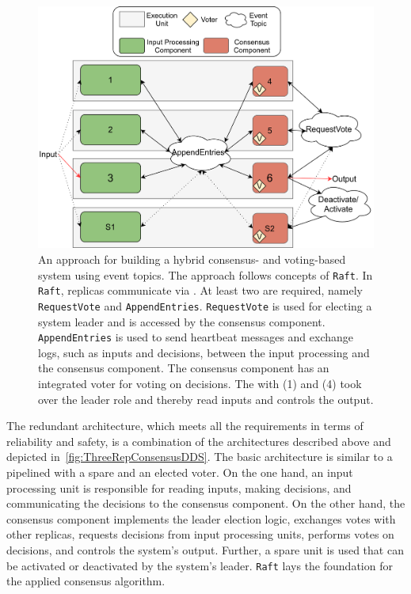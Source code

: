 \begin{figure}[!hb]
	\centering
	\includegraphics[width=0.9\linewidth]{images/ThreeEUConsensusDDS}
	\caption{An approach for building a hybrid consensus- and voting-based  system using  event topics. The approach follows concepts of \texttt{Raft}. In \texttt{Raft}, replicas communicate via . At least two  are required, namely \texttt{RequestVote} and \texttt{AppendEntries}. \texttt{RequestVote} is used for electing a system leader and is accessed by the consensus component. \texttt{AppendEntries} is used to send heartbeat messages and exchange logs, such as inputs and decisions, between the input processing and the consensus component. The consensus component has an integrated voter for voting on decisions. The  with (1) and (4) took over the leader role and thereby read inputs and controls the output.}
	\label{fig:ThreeRepConsensusDDS}
\end{figure}

The redundant architecture, which meets all the requirements in terms of reliability and safety, is a combination of the architectures described above and depicted in~\autoref{fig:ThreeRepConsensusDDS}.
The basic architecture is similar to a pipelined  with a spare and an elected voter.
On the one hand, an input processing unit is responsible for reading inputs, making decisions, and communicating the decisions to the consensus component.
On the other hand, the consensus component implements the leader election logic, exchanges votes with other replicas, requests decisions from input processing units, performs votes on decisions, and controls the system's output.
Further, a spare unit is used that can be activated or deactivated by the system's leader.
\texttt{Raft} lays the foundation for the applied consensus algorithm.
\\

